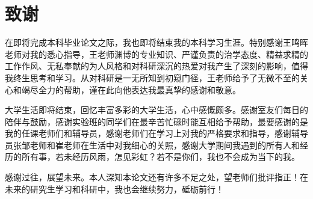 \section*{致谢}
在即将完成本科毕业论文之际，我也即将结束我的本科学习生涯。特别感谢王鸣晖老师对我的悉心指导，王老师渊博的专业知识、严谨负责的治学态度、精益求精的工作作风、无私奉献的为人风格和对科研深沉的热爱对我产生了深刻的影响，值得我终生思考和学习。从对科研是一无所知到初窥门径，王老师给予了无微不至的关心和竭尽全力的帮助，谨在此向他表达我最真挚的感谢和敬意。

大学生活即将结束，回忆丰富多彩的大学生活，心中感慨颇多。感谢室友们每日的陪伴与鼓励，感谢实验班的同学们在最辛苦忙碌时能互相给予帮助，最要感谢的是我的任课老师们和辅导员，感谢老师们在学习上对我的严格要求和指导，感谢辅导员张邹老师和崔老师在生活中对我细心的关照，感谢大学期间我遇到的所有人和经历的所有事，若未经历风雨，怎见彩虹？若不是你们，我也不会成为当下的我。

感谢过往，展望未来。本人深知本论文还有许多不足之处，望老师们批评指正！在未来的研究生学习和科研中，我也会继续努力，砥砺前行！
